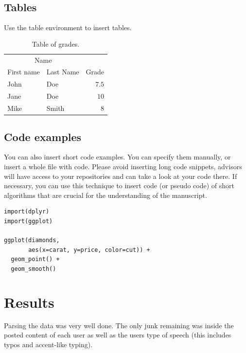 \documentclass[fleqn,moreauthors,10pt]{ds_report}
\begin{document}
\subsection*{Tables}

Use the table environment to insert tables.

\begin{table}[hbt]
	\caption{Table of grades.}
	\centering
	\begin{tabular}{l l | r}
		\toprule
		\multicolumn{2}{c}{Name} \\
		\cmidrule(r){1-2}
		First name & Last Name & Grade \\
		\midrule
		John & Doe & $7.5$ \\
		Jane & Doe & $10$ \\
		Mike & Smith & $8$ \\
		\bottomrule
	\end{tabular}
	\label{tab:label}
\end{table}


\subsection*{Code examples}

You can also insert short code examples. You can specify them manually, or insert a whole file with code. Please avoid inserting long code snippets, advisors will have access to your repositories and can take a look at your code there. If necessary, you can use this technique to insert code (or pseudo code) of short algorithms that are crucial for the understanding of the manuscript.

\lstset{language=Python}


\lstset{language=R}
\begin{lstlisting}
import(dplyr)
import(ggplot)

ggplot(diamonds,
	   aes(x=carat, y=price, color=cut)) +
  geom_point() +
  geom_smooth()
\end{lstlisting}

\fi
\section*{Results}

Parsing the data was very well done. The only junk remaining was inside the posted content of each user as well as the users type of speech (this includes typos and accent-like typing).

\end{document}
